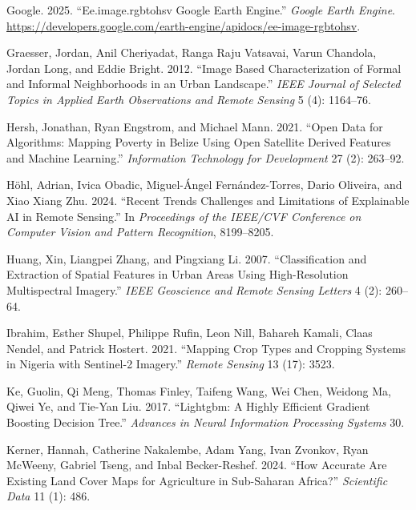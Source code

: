 \documentclass[
  journal,
  twocolumn]{IEEEtran}
\newlength{\cslhangindent}
\newlength{\cslentryspacingunit} %
\newenvironment{CSLReferences}[2] %
 {%
  \setlength{\parindent}{0pt}
  \ifodd #1
  \let\oldpar\par
  \def\par{\hangindent=\cslhangindent\oldpar}
  \fi
  \setlength{\parskip}{#2\cslentryspacingunit}
 }%
 {}
\begin{document}
\begin{CSLReferences}{1}{0}
\leavevmode{}%
Google. 2025. {``Ee.image.rgbtohsv Google Earth Engine.''} \emph{Google
Earth Engine}.
\url{https://developers.google.com/earth-engine/apidocs/ee-image-rgbtohsv}.

\leavevmode{}%
Graesser, Jordan, Anil Cheriyadat, Ranga Raju Vatsavai, Varun Chandola,
Jordan Long, and Eddie Bright. 2012. {``Image Based Characterization of
Formal and Informal Neighborhoods in an Urban Landscape.''} \emph{IEEE
Journal of Selected Topics in Applied Earth Observations and Remote
Sensing} 5 (4): 1164--76.

\leavevmode{}%
Hersh, Jonathan, Ryan Engstrom, and Michael Mann. 2021. {``Open Data for
Algorithms: Mapping Poverty in Belize Using Open Satellite Derived
Features and Machine Learning.''} \emph{Information Technology for
Development} 27 (2): 263--92.

\leavevmode{}%
Höhl, Adrian, Ivica Obadic, Miguel-Ángel Fernández-Torres, Dario
Oliveira, and Xiao Xiang Zhu. 2024. {``Recent Trends Challenges and
Limitations of Explainable AI in Remote Sensing.''} In \emph{Proceedings
of the IEEE/CVF Conference on Computer Vision and Pattern Recognition},
8199--8205.

\leavevmode{}%
Huang, Xin, Liangpei Zhang, and Pingxiang Li. 2007. {``Classification
and Extraction of Spatial Features in Urban Areas Using High-Resolution
Multispectral Imagery.''} \emph{IEEE Geoscience and Remote Sensing
Letters} 4 (2): 260--64.

\leavevmode{}%
Ibrahim, Esther Shupel, Philippe Rufin, Leon Nill, Bahareh Kamali, Claas
Nendel, and Patrick Hostert. 2021. {``Mapping Crop Types and Cropping
Systems in Nigeria with Sentinel-2 Imagery.''} \emph{Remote Sensing} 13
(17): 3523.

\leavevmode{}%
Ke, Guolin, Qi Meng, Thomas Finley, Taifeng Wang, Wei Chen, Weidong Ma,
Qiwei Ye, and Tie-Yan Liu. 2017. {``Lightgbm: A Highly Efficient
Gradient Boosting Decision Tree.''} \emph{Advances in Neural Information
Processing Systems} 30.

\leavevmode{}%
Kerner, Hannah, Catherine Nakalembe, Adam Yang, Ivan Zvonkov, Ryan
McWeeny, Gabriel Tseng, and Inbal Becker-Reshef. 2024. {``How Accurate
Are Existing Land Cover Maps for Agriculture in Sub-Saharan Africa?''}
\emph{Scientific Data} 11 (1): 486.


\end{CSLReferences}
\end{document}
